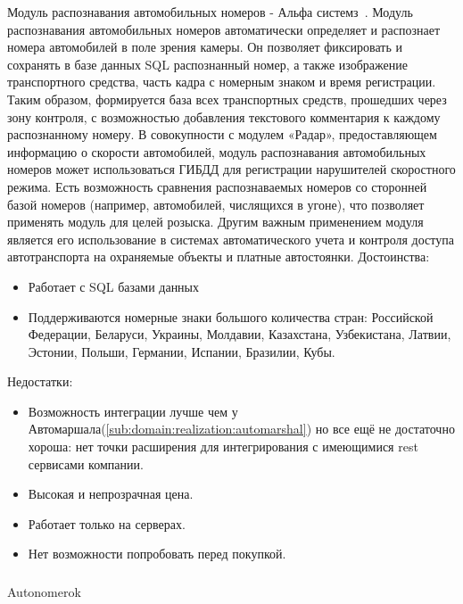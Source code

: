 Модуль распознавания автомобильных номеров - Альфа системз~\cite{alpha_system}. Модуль распознавания автомобильных номеров автоматически определяет и распознает номера автомобилей в поле зрения камеры. Он позволяет фиксировать и сохранять в базе данных SQL распознанный номер, а также изображение транспортного средства, часть кадра с номерным знаком и время регистрации. Таким образом, формируется база всех транспортных средств, прошедших через зону контроля, с возможностью добавления текстового комментария к каждому распознанному номеру. В совокупности с модулем «Радар», предоставляющем информацию о скорости автомобилей, модуль распознавания автомобильных номеров может использоваться ГИБДД для регистрации нарушителей скоростного режима. Есть возможность сравнения распознаваемых номеров со сторонней базой номеров (например, автомобилей, числящихся в угоне), что позволяет применять модуль для целей розыска. Другим важным применением модуля является его использование в системах автоматического учета и контроля доступа автотранспорта на охраняемые объекты и платные автостоянки.
Достоинства:
\begin{itemize}
  \item Работает с SQL базами данных
  \item Поддерживаются номерные знаки большого количества стран: Российской Федерации, Беларуси, Украины, Молдавии, Казахстана, Узбекистана, Латвии, Эстонии, Польши, Германии, Испании, Бразилии, Кубы.
\end{itemize}
Недостатки:
\begin{itemize}
  \item Возможность интеграции лучше чем у Автомаршала(\ref{sub:domain:realization:automarshal}) но все ещё не достаточно хороша: нет точки расширения для интегрирования с имеющимися rest сервисами компании.
  \item Высокая и непрозрачная цена.
  \item Работает только на \windows{} серверах.
  \item Нет возможности попробовать перед покупкой.
\end{itemize}

\subsubsection{}
Autonomerok

